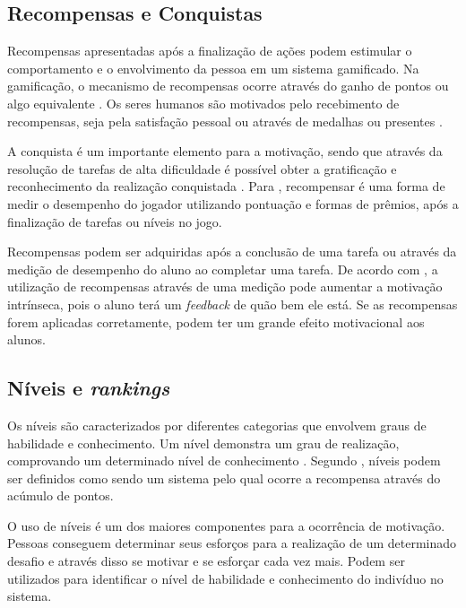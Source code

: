 \documentclass[
	12pt,				%
	oneside,			%
	a4paper,			%
	english,			%
	french,				%
	spanish,			%
	brazil,				%
	]{abntex2}
\begin{document}
\subsection{Recompensas e Conquistas}    

Recompensas apresentadas após a finalização de ações podem estimular o comportamento e o envolvimento da pessoa em um sistema gamificado. Na gamificação, o mecanismo de recompensas ocorre através do ganho de pontos ou algo equivalente \cite{kaap:2014}. Os seres humanos são motivados pelo recebimento de recompensas, seja pela satisfação pessoal ou através de medalhas ou presentes \cite{quadros2016gamificaccao}.

A conquista é um importante elemento para a motivação, sendo que através da resolução de tarefas de alta dificuldade é possível obter a gratificação e reconhecimento da realização conquistada \cite{quadros2016gamificaccao}. Para \citet{busarello2016gamificaccao}, recompensar é uma forma de medir o desempenho do jogador utilizando pontuação e formas de prêmios, após a finalização de tarefas ou níveis no jogo.

Recompensas podem ser adquiridas após a conclusão de uma tarefa ou através da medição de desempenho do aluno ao completar uma tarefa. De acordo com \citet{quadros2016gamificaccao}, a utilização de recompensas através de uma medição pode aumentar a motivação intrínseca, pois o aluno terá um \textit{feedback} de quão bem ele está. Se as recompensas forem aplicadas corretamente, podem ter um grande efeito motivacional aos alunos.
    
\subsection{Níveis e \textit{rankings}}        

Os níveis são caracterizados por diferentes categorias que envolvem graus de habilidade e conhecimento. Um nível demonstra um grau de realização, comprovando um determinado nível de conhecimento \cite{kaap:2014}. Segundo \citet{quadros2016gamificaccao}, níveis podem ser definidos como sendo um sistema pelo qual ocorre a recompensa através do acúmulo de pontos.

O uso de níveis é um dos maiores componentes para a ocorrência de motivação. Pessoas conseguem determinar seus esforços para a realização de um determinado desafio e através disso se motivar e se esforçar cada vez mais. Podem ser utilizados para identificar o nível de habilidade e conhecimento do indivíduo no sistema.
\end{document}
